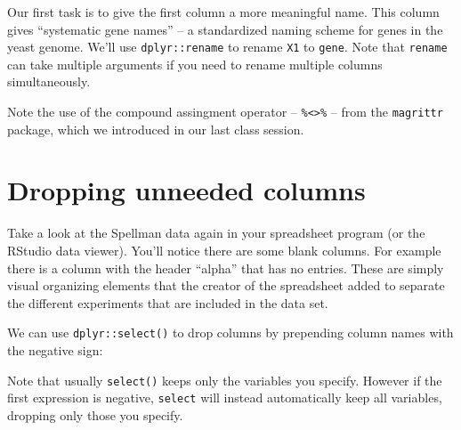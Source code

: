 \documentclass[]{book}
\newenvironment{Shaded}{\begin{snugshade}}{\end{snugshade}}
\newcommand{\CommentTok}[1]{\textcolor[rgb]{0.56,0.35,0.01}{\textit{#1}}}
\newcommand{\DataTypeTok}[1]{\textcolor[rgb]{0.13,0.29,0.53}{#1}}
\newcommand{\KeywordTok}[1]{\textcolor[rgb]{0.13,0.29,0.53}{\textbf{#1}}}
\newcommand{\NormalTok}[1]{#1}
\newcommand{\OperatorTok}[1]{\textcolor[rgb]{0.81,0.36,0.00}{\textbf{#1}}}
\newcommand{\StringTok}[1]{\textcolor[rgb]{0.31,0.60,0.02}{#1}}
\theoremstyle{definition}
\theoremstyle{definition}
\theoremstyle{definition}
\theoremstyle{remark}
\begin{document}
Our first task is to give the first column a more meaningful name. This
column gives ``systematic gene names'' -- a standardized naming scheme
for genes in the yeast genome. We'll use \texttt{dplyr::rename} to
rename \texttt{X1} to \texttt{gene}. Note that \texttt{rename} can take
multiple arguments if you need to rename multiple columns
simultaneously.

\begin{Shaded}
\end{Shaded}

Note the use of the compound assingment operator --
\texttt{\%\textless{}\textgreater{}\%} -- from the \texttt{magrittr}
package, which we introduced in our last class session.

\hypertarget{dropping-unneeded-columns}{%
\section{Dropping unneeded columns}\label{dropping-unneeded-columns}}

Take a look at the Spellman data again in your spreadsheet program (or
the RStudio data viewer). You'll notice there are some blank columns.
For example there is a column with the header ``alpha'' that has no
entries. These are simply visual organizing elements that the creator of
the spreadsheet added to separate the different experiments that are
included in the data set.

We can use \texttt{dplyr::select()} to drop columns by prepending column
names with the negative sign:

\begin{Shaded}
\end{Shaded}

Note that usually \texttt{select()} keeps only the variables you
specify. However if the first expression is negative, \texttt{select}
will instead automatically keep all variables, dropping only those you
specify.
\end{document}
